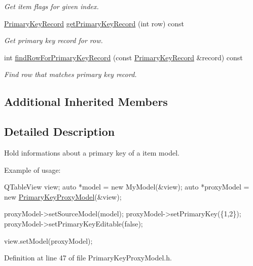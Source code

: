 \begin{DoxyCompactItemize}
\begin{DoxyCompactList}\small\item\em Get item flags for given index. \end{DoxyCompactList}\item 
\hyperlink{class_mdt_1_1_item_model_1_1_primary_key_record}{Primary\+Key\+Record} \hyperlink{class_mdt_1_1_item_model_1_1_primary_key_proxy_model_aed26b58c40b2285ccab159f820454763}{get\+Primary\+Key\+Record} (int row) const 
\begin{DoxyCompactList}\small\item\em Get primary key record for row. \end{DoxyCompactList}\item 
int \hyperlink{class_mdt_1_1_item_model_1_1_primary_key_proxy_model_a8ebe6766659d3e3f0e640f71b8cd3673}{find\+Row\+For\+Primary\+Key\+Record} (const \hyperlink{class_mdt_1_1_item_model_1_1_primary_key_record}{Primary\+Key\+Record} \&record) const 
\begin{DoxyCompactList}\small\item\em Find row that matches primary key record. \end{DoxyCompactList}\end{DoxyCompactItemize}
\subsection*{Additional Inherited Members}


\subsection{Detailed Description}
Hold informations about a primary key of a item model. 

Example of usage\+: 
\begin{DoxyCode}
QTableView view;
\textcolor{keyword}{auto} *model = \textcolor{keyword}{new} MyModel(&view);
\textcolor{keyword}{auto} *proxyModel = \textcolor{keyword}{new} \hyperlink{class_mdt_1_1_item_model_1_1_primary_key_proxy_model_a38f37907461e93ff3b495913670a81e4}{PrimaryKeyProxyModel}(&view);

proxyModel->setSourceModel(model);
proxyModel->setPrimaryKey(\{1,2\});
proxyModel->setPrimaryKeyEditable(\textcolor{keyword}{false});

view.setModel(proxyModel);
\end{DoxyCode}
 

Definition at line 47 of file Primary\+Key\+Proxy\+Model.\+h.



